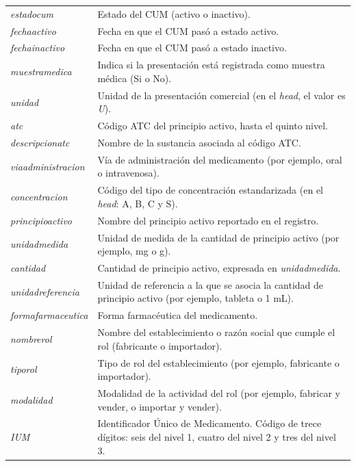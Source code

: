 \documentclass[10pt,twoside,xcolor=table,x11anmes]{IEEEtran}
\begin{document}
\begin{table}[!t]
\begin{tabular}{>{\raggedright\arraybackslash}p{} >{\raggedright\arraybackslash}p{}}
\textit{estadocum} & Estado del CUM (activo o inactivo). \\
\textit{fechaactivo} & Fecha en que el CUM pasó a estado activo. \\
\textit{fechainactivo} & Fecha en que el CUM pasó a estado inactivo. \\
\textit{muestramedica} & Indica si la presentación está registrada como muestra médica (Si o No). \\
\textit{unidad} & Unidad de la presentación comercial (en el \textit{head}, el valor es \textit{U}). \\
\textit{atc} & Código ATC del principio activo, hasta el quinto nivel. \\
\textit{descripcionatc} & Nombre de la sustancia asociada al código ATC. \\
\textit{viaadministracion} & Vía de administración del medicamento (por ejemplo, oral o intravenosa). \\
\textit{concentracion} & Código del tipo de concentración estandarizada (en el \textit{head}: A, B, C y S). \\
\textit{principioactivo} & Nombre del principio activo reportado en el registro. \\
\textit{unidadmedida} & Unidad de medida de la cantidad de principio activo (por ejemplo, mg o g). \\
\textit{cantidad} & Cantidad de principio activo, expresada en \textit{unidadmedida}. \\
\textit{unidadreferencia} & Unidad de referencia a la que se asocia la cantidad de principio activo (por ejemplo, tableta o 1 mL). \\
\textit{formafarmaceutica} & Forma farmacéutica del medicamento. \\
\textit{nombrerol} & Nombre del establecimiento o razón social que cumple el rol (fabricante o importador). \\
\textit{tiporol} & Tipo de rol del establecimiento (por ejemplo, fabricante o importador). \\
\textit{modalidad} & Modalidad de la actividad del rol (por ejemplo, fabricar y vender, o importar y vender). \\
\textit{IUM} & Identificador Único de Medicamento. Código de trece dígitos: seis del nivel 1, cuatro del nivel 2 y tres del nivel 3. \\
\bottomrule
\end{tabular}
\end{table}
\end{document}
